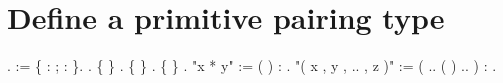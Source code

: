 \begin{coqdoccode}
\end{coqdoccode}
\section{Define a primitive pairing type}

\begin{coqdoccode}
\coqdocnoindent
{}  .\coqdoceol
\coqdocnoindent
{}    :=  \{  :  ;  :  \}.\coqdoceol
\coqdocnoindent
{}   .\coqdoceol
\coqdocemptyline
\coqdocnoindent
{}  \{ \} \coqdocvar{\_} \coqdocvar{\_}.\coqdoceol
\coqdocnoindent
{}  \{ \} \coqdocvar{\_}.\coqdoceol
\coqdocnoindent
{}  \{ \} \coqdocvar{\_}.\coqdoceol
\coqdocemptyline
\coqdocnoindent
{} "x * y" := (  ) : .\coqdoceol
\coqdocnoindent
{} "( x , y , .. , z )" := ( .. (  ) .. ) : .\coqdoceol
\end{coqdoccode}
